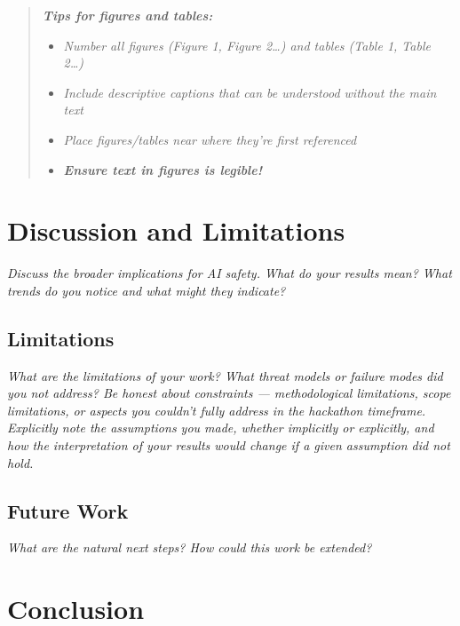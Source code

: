 \documentclass[11pt]{article}
\begin{document}
\begin{quote}
\textit{\textbf{Tips for figures and tables:}}
\begin{itemize}[label=--]
  \item \textit{Number all figures (Figure 1, Figure 2\ldots) and tables (Table 1, Table
  2\ldots)}
  \item \textit{Include descriptive captions that can be understood without the main text}
  \item \textit{Place figures/tables near where they're first referenced}
  \item \textit{\textbf{Ensure text in figures is legible!}}
\end{itemize}
\end{quote}

\section{Discussion and Limitations}

\textit{Discuss the broader implications for AI safety.
What do your results mean? What trends do you notice and what might they indicate?}

\subsection*{Limitations}

\textit{What are the limitations of your work? What threat models or failure modes did you not
address? Be honest about constraints --- methodological limitations, scope limitations, or
aspects you couldn't fully address in the hackathon timeframe. Explicitly note the assumptions
you made, whether implicitly or explicitly, and how the interpretation of your results would
change if a given assumption did not hold.}

\subsection*{Future Work}

\textit{What are the natural next steps? How could this work be extended?}

\section{Conclusion}
\end{document}
